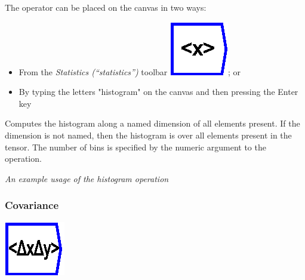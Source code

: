 The operator can be placed on the canvas in two ways:
\begin{itemize}
\item From the \emph{Statistics (``statistics'')} toolbar \includegraphics{images/mean};
or 
\item By typing the letters "histogram" on the canvas and then pressing
the Enter key
\end{itemize}
Computes the histogram along a named dimension of all elements present.
If the dimension is not named, then the histogram is over all elements
present in the tensor. The number of bins is specified by the numeric
argument to the operation.
\begin{center}
\par\end{center}

\begin{center}
{\em An example usage of the histogram operation} 
\par\end{center}

\subsubsection{Covariance}

\label{Operation:covariance}

\includegraphics{images/covariance}

